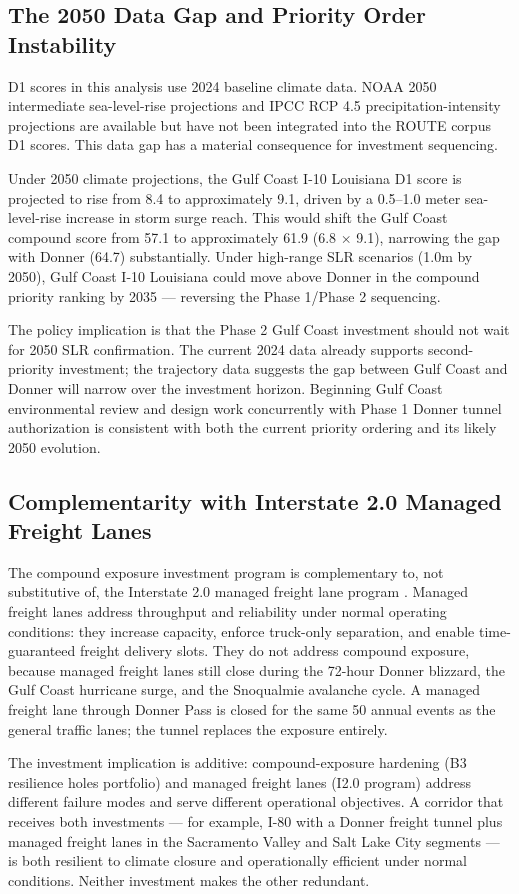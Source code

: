 \subsection{The 2050 Data Gap and Priority Order Instability}

D1 scores in this analysis use 2024 baseline climate data. NOAA 2050 intermediate sea-level-rise projections and IPCC RCP 4.5 precipitation-intensity projections are available but have not been integrated into the ROUTE corpus D1 scores. This data gap has a material consequence for investment sequencing.

Under 2050 climate projections, the Gulf Coast I-10 Louisiana D1 score is projected to rise from 8.4 to approximately 9.1, driven by a 0.5--1.0 meter sea-level-rise increase in storm surge reach. This would shift the Gulf Coast compound score from 57.1 to approximately 61.9 (6.8 $\times$ 9.1), narrowing the gap with Donner (64.7) substantially. Under high-range SLR scenarios (1.0m by 2050), Gulf Coast I-10 Louisiana could move above Donner in the compound priority ranking by 2035 --- reversing the Phase 1/Phase 2 sequencing.

The policy implication is that the Phase 2 Gulf Coast investment should not wait for 2050 SLR confirmation. The current 2024 data already supports second-priority investment; the trajectory data suggests the gap between Gulf Coast and Donner will narrow over the investment horizon. Beginning Gulf Coast environmental review and design work concurrently with Phase 1 Donner tunnel authorization is consistent with both the current priority ordering and its likely 2050 evolution.

\subsection{Complementarity with Interstate 2.0 Managed Freight Lanes}

The compound exposure investment program is complementary to, not substitutive of, the Interstate 2.0 managed freight lane program \citep{ROUTE_D1}. Managed freight lanes address throughput and reliability under normal operating conditions: they increase capacity, enforce truck-only separation, and enable time-guaranteed freight delivery slots. They do not address compound exposure, because managed freight lanes still close during the 72-hour Donner blizzard, the Gulf Coast hurricane surge, and the Snoqualmie avalanche cycle. A managed freight lane through Donner Pass is closed for the same 50 annual events as the general traffic lanes; the tunnel replaces the exposure entirely.

The investment implication is additive: compound-exposure hardening (B3 resilience holes portfolio) and managed freight lanes (I2.0 program) address different failure modes and serve different operational objectives. A corridor that receives both investments --- for example, I-80 with a Donner freight tunnel plus managed freight lanes in the Sacramento Valley and Salt Lake City segments --- is both resilient to climate closure and operationally efficient under normal conditions. Neither investment makes the other redundant.
